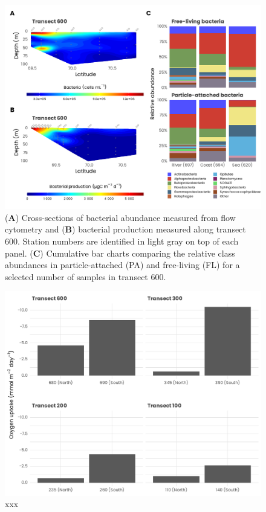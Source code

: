 \documentclass[essd, manuscript]{copernicus}
\begin{document}
\clearpage

\begin{figure}[H]
    \centering
    \includegraphics[scale = 1]{../../../graphs/fig14.pdf}
    \caption{(\textbf{A}) Cross-sections of bacterial abundance measured from flow cytometry and (\textbf{B}) bacterial production measured along transect 600. Station numbers are identified in light gray on top of each panel. (\textbf{C}) Cumulative bar charts comparing the relative class abundances in particle-attached (PA) and free-living (FL) for a selected number of samples in transect 600.}
\end{figure}

\begin{figure}[H]
    \centering
    \includegraphics[scale = 1]{../../../graphs/fig_o2_uptake.pdf}
    \caption{xxx}
\end{figure}
\end{document}
